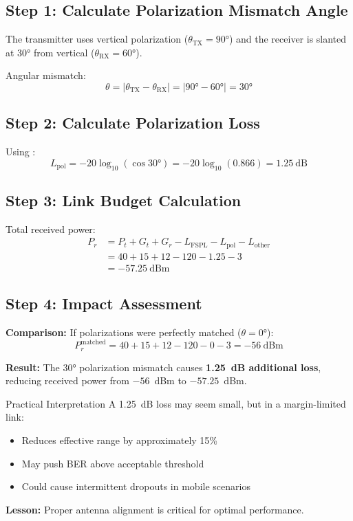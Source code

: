 \subsection*{Step 1: Calculate Polarization Mismatch Angle}

The transmitter uses vertical polarization ($\theta_{\text{TX}} = 90°$) and the receiver is slanted at $30°$ from vertical ($\theta_{\text{RX}} = 60°$).

Angular mismatch:
\begin{equation}
\theta = |\theta_{\text{TX}} - \theta_{\text{RX}}| = |90° - 60°| = 30°
\end{equation}

\subsection*{Step 2: Calculate Polarization Loss}

Using :
\begin{equation}
L_{\text{pol}} = -20\log_{10}(\cos 30°) = -20\log_{10}(0.866) = 1.25~\text{dB}
\end{equation}

\subsection*{Step 3: Link Budget Calculation}

Total received power:
\begin{align}
P_r &= P_t + G_t + G_r - L_{\text{FSPL}} - L_{\text{pol}} - L_{\text{other}} \\
&= 40 + 15 + 12 - 120 - 1.25 - 3 \\
&= -57.25~\text{dBm}
\end{align}

\subsection*{Step 4: Impact Assessment}

\textbf{Comparison:} If polarizations were perfectly matched ($\theta = 0°$):
\begin{equation}
P_r^{\text{matched}} = 40 + 15 + 12 - 120 - 0 - 3 = -56~\text{dBm}
\end{equation}

\textbf{Result:} The $30°$ polarization mismatch causes \textbf{1.25~dB additional loss}, reducing received power from $-56$~dBm to $-57.25$~dBm.

\begin{calloutbox}[colback=black!8!white,colframe=black]{Practical Interpretation}
A 1.25~dB loss may seem small, but in a margin-limited link:
\begin{itemize}
\item Reduces effective range by approximately 15\%
\item May push BER above acceptable threshold
\item Could cause intermittent dropouts in mobile scenarios
\end{itemize}

\textbf{Lesson:} Proper antenna alignment is critical for optimal performance.
\end{calloutbox}

